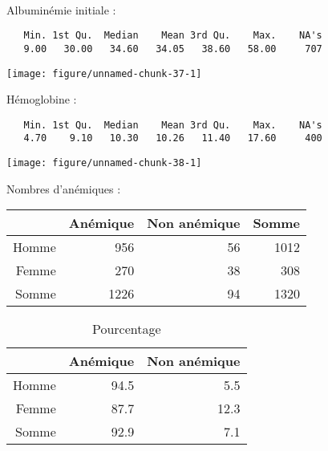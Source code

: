 \documentclass[11pt,a4paper]{article}\usepackage[]{graphicx}\usepackage[]{color}
\makeatletter
\def\maxwidth{ %
  \ifdim\Gin@nat@width>\linewidth
    \linewidth
  \else
    \Gin@nat@width
  \fi
}
\newenvironment{kframe}{%
 \def\at@end@of@kframe{}%
 \ifinner\ifhmode%
  \def\at@end@of@kframe{\end{minipage}}%
  \begin{minipage}{\columnwidth}%
 \fi\fi%
 \def\FrameCommand##1{\hskip\@totalleftmargin \hskip-\fboxsep
 \colorbox{shadecolor}{##1}\hskip-\fboxsep
     \hskip-\linewidth \hskip-\@totalleftmargin \hskip\columnwidth}%
 \MakeFramed {\advance\hsize-\width
   \@totalleftmargin\z@ \linewidth\hsize
   \@setminipage}}%
 {\par\unskip\endMakeFramed%
 \at@end@of@kframe}
\newenvironment{knitrout}{}{} %
\makeatother
\begin{document}
~\\

Albuminémie initiale :


\begin{knitrout}
\color{fgcolor}\begin{kframe}
\begin{verbatim}
   Min. 1st Qu.  Median    Mean 3rd Qu.    Max.    NA's 
   9.00   30.00   34.60   34.05   38.60   58.00     707 
\end{verbatim}
\end{kframe}
\texttt{[image: figure/unnamed-chunk-37-1]} 

\end{knitrout}

Hémoglobine :

\begin{knitrout}
\color{fgcolor}\begin{kframe}
\begin{verbatim}
   Min. 1st Qu.  Median    Mean 3rd Qu.    Max.    NA's 
   4.70    9.10   10.30   10.26   11.40   17.60     400 
\end{verbatim}
\end{kframe}
\texttt{[image: figure/unnamed-chunk-38-1]} 

\end{knitrout}

Nombres d'anémiques :

\begin{table}[ht]
\centering
\begin{tabular}{rrrr}
  \hline
 & Anémique & Non anémique & Somme \\ 
  \hline
Homme & 956 & 56 & 1012 \\ 
  Femme & 270 & 38 & 308 \\ 
  Somme & 1226 & 94 & 1320 \\ 
   \hline
\end{tabular}
\end{table}
\begin{table}[ht]
\centering
\begin{tabular}{rrr}
  \hline
 & Anémique & Non anémique \\ 
  \hline
Homme & 94.5 & 5.5 \\ 
  Femme & 87.7 & 12.3 \\ 
  Somme & 92.9 & 7.1 \\ 
   \hline
\end{tabular}
\caption{Pourcentage} 
\end{table}
\end{document}
